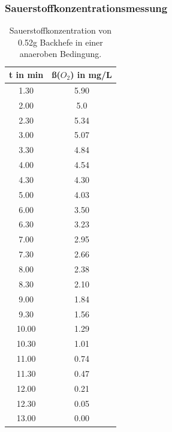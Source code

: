 \documentclass[10pt,a4paper]{article}
\begin{document}
	\subsubsection{Sauerstoffkonzentrationsmessung}		
	\begin{table}[H]
		\centering
		\caption{Sauerstoffkonzentration von 0.52g Backhefe in einer anaeroben Bedingung.}
		\label{tab:O2 Backhefe ohne KCN}
		\begin{tabular}{cc}
			\toprule
			t in min& ß($O_2$) in mg/L\\
			\midrule
			1.30 & 5.90\\
			2.00 & 5.0\\
			2.30 & 5.34\\
			3.00 & 5.07\\
			3.30 & 4.84 \\
			4.00 & 4.54 \\
			4.30 & 4.30 \\
			5.00 & 4.03 \\
			6.00 & 3.50 \\
			6.30 & 3.23\\
			7.00 & 2.95\\
			7.30 & 2.66\\
			8.00 & 2.38\\
			8.30 & 2.10 \\
			9.00 & 1.84\\
			9.30 & 1.56 \\
			10.00 & 1.29\\
			10.30 & 1.01\\
			11.00 & 0.74\\
			11.30 & 0.47\\
			12.00 & 0.21\\
			12.30 & 0.05\\
			13.00 & 0.00\\			
			\bottomrule
		\end{tabular}
	\end{table}	
	
\end{document}
